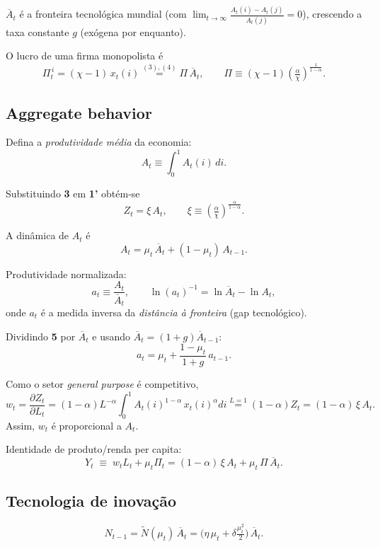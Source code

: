 \documentclass[a4paper,12pt]{article}[abntex2]
\begin{document}
$\overline{A}_t$ é a fronteira tecnológica mundial (com $\displaystyle\lim_{t\to\infty}\frac{A_t(i)-A_t(j)}{A_t(j)}=0$), crescendo a taxa constante $g$ (exógena por enquanto).

O lucro de uma firma monopolista é
\[
    \Pi_t^{\,i}
      = (\chi-1)\,x_t(i)
      \stackrel{(3),(4)}{=}
        \Pi\,\overline{A}_t,
    \qquad
    \Pi\equiv(\chi-1)
          \left(\tfrac{\alpha}{\chi}\right)^{\frac{1}{1-\alpha}}.
\]

\subsection{\textbf{Aggregate behavior}}

Defina a \emph{produtividade média} da economia:
\[
    A_t \equiv \int_{0}^{1} A_t(i)\,di.
\]

Substituindo \textbf{3} em \textbf{1'} obtém-se
\[
    Z_t
      = \xi\,A_t,
    \qquad
    \xi \equiv \left(\tfrac{\alpha}{\chi}\right)^{\frac{\alpha}{1-\alpha}}.
\]

A dinâmica de $A_t$ é
\[
    A_t
      = \mu_t\,\overline{A}_t + (1-\mu_t)\,A_{t-1}.
    \tag{5}
\]

Produtividade normalizada:
\[
    a_t \equiv \frac{A_t}{\overline{A}_t},
    \qquad
    \ln(a_t)^{-1}= \ln\overline{A}_t - \ln A_t,
\]
onde $a_t$ é a medida inversa da \emph{distância à fronteira} (gap tecnológico).

Dividindo \textbf{5} por $\overline{A}_t$ e usando $\overline{A}_t=(1+g)\overline{A}_{t-1}$:
\[
    a_t
      = \mu_t + \frac{1-\mu_t}{1+g}\,a_{t-1}.
    \tag{5'}
\]

Como o setor \emph{general purpose} é competitivo,
\[
    w_t
      = \frac{\partial Z_t}{\partial L_t}
      = (1-\alpha)L^{-\alpha}\!\int_{0}^{1} A_t(i)^{1-\alpha}\,x_t(i)^{\alpha}di
      \stackrel{L=1}{=}
        (1-\alpha)Z_t
      = (1-\alpha)\,\xi\,A_t.
    \tag{6}
\]
Assim, $w_t$ é proporcional a $A_t$.

Identidade de produto/renda per capita:
\[
    Y_t
      \;\equiv\;
      w_t L_t + \mu_t \Pi_t
      = (1-\alpha)\,\xi\,A_t
      + \mu_t\,\Pi\,\overline{A}_t.
    \tag{7}
\]

\subsection{\textbf{Tecnologia de inovação}}

\[
    N_{t-1}
      = \tilde{N}(\mu_t)\,\overline{A}_t
      = \bigl(\eta\,\mu_t + \delta\tfrac{\mu_t^{2}}{2}\bigr)\,\overline{A}_t.
    \tag{8}
\]
\end{document}
